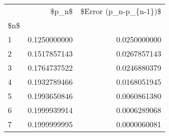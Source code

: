 \begin{tabular}{lrr}
\toprule
{} &         \$p\_n\$ &  \$Error (p\_n-p\_\{n-1\})\$ \\
\$n\$ &               &                        \\
\midrule
1   &  0.1250000000 &           0.0250000000 \\
2   &  0.1517857143 &           0.0267857143 \\
3   &  0.1764737522 &           0.0246880379 \\
4   &  0.1932789466 &           0.0168051945 \\
5   &  0.1993650846 &           0.0060861380 \\
6   &  0.1999939914 &           0.0006289068 \\
7   &  0.1999999995 &           0.0000060081 \\
\bottomrule
\end{tabular}
